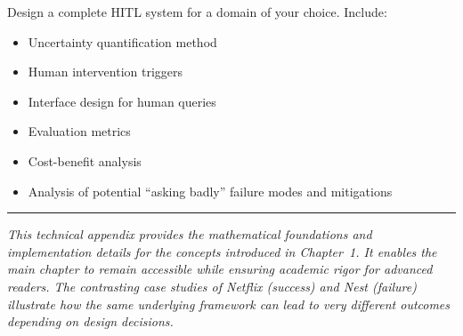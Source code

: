\begin{Exercise}
Design a complete HITL system for a domain of your choice. Include:
\begin{itemize}
    \item Uncertainty quantification method
    \item Human intervention triggers
    \item Interface design for human queries
    \item Evaluation metrics
    \item Cost-benefit analysis
    \item Analysis of potential ``asking badly'' failure modes and mitigations
\end{itemize}
\end{Exercise}

\bigskip
\begin{center}
\rule{0.5\textwidth}{0.4pt}
\end{center}
\bigskip

\noindent\textit{This technical appendix provides the mathematical foundations and implementation details for the concepts introduced in Chapter~1. It enables the main chapter to remain accessible while ensuring academic rigor for advanced readers. The contrasting case studies of Netflix (success) and Nest (failure) illustrate how the same underlying framework can lead to very different outcomes depending on design decisions.}
\apxnumoff

